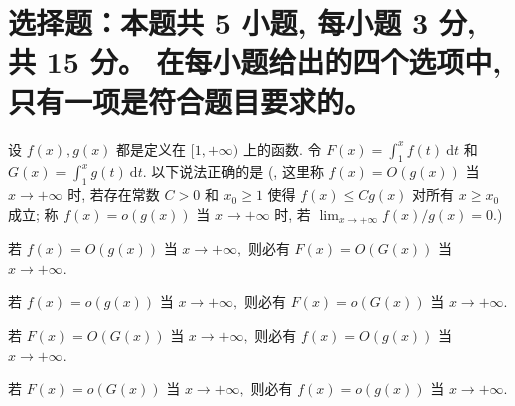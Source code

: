 


\makeexamtitle



\section{%
  选择题：本题共 5 小题, 每小题 3 分, 共 15 分。
  在每小题给出的四个选项中, 只有一项是符合题目要求的。
}


\begin{question}
设 $f(x), g(x)$ 都是定义在 $[1, +\infty)$ 上的函数. 令 $F(x) = \int_1^x f(t) ~ \mathrm{d}t$ 和 $G(x) = \int_1^x g(t) ~ \mathrm{d}t.$ 以下说法正确的是 (, 这里称 $f(x) = O(g(x))$ 当 $x \to +\infty$ 时, 若存在常数 $C > 0$ 和 $x_0 \geq 1$ 使得 $f(x) \leqslant C g(x)$ 对所有 $x \geq x_0$ 成立; 称 $f(x) = o(g(x))$ 当 $x \to +\infty$ 时, 若 $\lim_{x \to +\infty} f(x)/g(x) = 0.$) \paren[A]

\begin{choices}
\item 若 $f(x) = O(g(x))$ 当 $x \to +\infty,$ 则必有 $F(x) = O(G(x))$ 当 $x \to +\infty.$
\item 若 $f(x) = o(g(x))$ 当 $x \to +\infty,$ 则必有 $F(x) = o(G(x))$ 当 $x \to +\infty.$
\item 若 $F(x) = O(G(x))$ 当 $x \to +\infty,$ 则必有 $f(x) = O(g(x))$ 当 $x \to +\infty.$
\item 若 $F(x) = o(G(x))$ 当 $x \to +\infty,$ 则必有 $f(x) = o(g(x))$ 当 $x \to +\infty.$
\end{choices}
\end{question}

